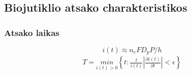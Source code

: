 \documentclass[12pt, a4paper, lithuanian]{article}
\begin{document}
\subsection{Biojutiklio atsako charakteristikos}
\subsubsection{Atsako laikas}
\begin{equation} 
    i(t) \approx n_eFD_pP/h 
\end{equation}
\begin{equation} 
\begin{aligned}
    T = \underset{i(t)>0}{min}\left\{t:\frac{t}{i(t)} \left| \frac{\partial i(t)}{\partial t}
    \right| < \epsilon \right\}
\end{aligned}
\end{equation}
% 
% 
% 
% 
\end{document}
